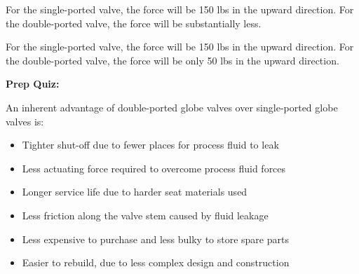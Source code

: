 For the single-ported valve, the force will be 150 lbs in the upward direction.  For the double-ported valve, the force will be substantially less.







For the single-ported valve, the force will be 150 lbs in the upward direction.  For the double-ported valve, the force will be only 50 lbs in the upward direction.









\vfil \eject

\noindent
{\bf Prep Quiz:}

An inherent advantage of double-ported globe valves over single-ported globe valves is:

\begin{itemize}
\item{} Tighter shut-off due to fewer places for process fluid to leak
\vskip 5pt 
\item{} Less actuating force required to overcome process fluid forces
\vskip 5pt 
\item{} Longer service life due to harder seat materials used
\vskip 5pt 
\item{} Less friction along the valve stem caused by fluid leakage
\vskip 5pt 
\item{} Less expensive to purchase and less bulky to store spare parts
\vskip 5pt 
\item{} Easier to rebuild, due to less complex design and construction
\end{itemize}




